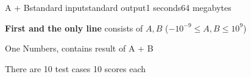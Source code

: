 \documentclass[11pt,a4paper]{article}
\begin{document}
\begin{problem}{A + B}{standard input}{standard output}{1 seconds}{64 megabytes}

\InputFile

\textbf{First and the only line} consists of $A, B$ ($-10^{-9} \le A, B \le 10^9$)

\OutputFile
One Numbers, contains result of A + B

\Scoring
There are 10 test cases 10 scores each

\Examples

\begin{example}
%
\end{example}

\end{problem}
\end{document}
